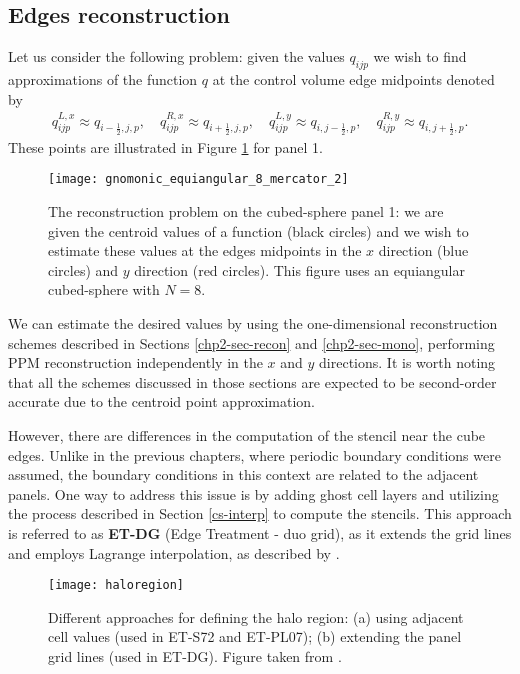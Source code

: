 \subsection{Edges reconstruction}
\label{cs-recon}
Let us consider the following problem: given the values $q_{ijp}$ we wish to find 
approximations of the function $q$ at the control volume edge midpoints denoted by
\begin{align*}
q^{L,x}_{ijp}  \approx q_{{i-\frac{1}{2}},j,p},\quad
q^{R,x}_{ijp}  \approx q_{{i+\frac{1}{2}},j,p},\quad
q^{L,y}_{ijp}  \approx q_{i,{j-\frac{1}{2}},p},\quad
q^{R,y}_{ijp}  \approx q_{i,{j+\frac{1}{2}},p}.
\end{align*}
These points are illustrated in Figure \ref{csgrid-rpoints} for panel 1.
\begin{figure}[!htb]
	\centering
	\texttt{[image: gnomonic\_equiangular\_8\_mercator\_2]}
	\caption{The reconstruction problem on the cubed-sphere panel 1: we are given the centroid values of a function (black circles)
		and we wish to estimate these values at the edges midpoints in the $x$ direction (blue circles) and $y$ direction (red circles).
		This figure uses an equiangular cubed-sphere with $N=8$.} \label{csgrid-rpoints}
\end{figure}

We can estimate the desired values by using the one-dimensional reconstruction schemes 
described in Sections \ref{chp2-sec-recon} and \ref{chp2-sec-mono}, 
performing PPM reconstruction independently in the $x$ and $y$ directions. 
It is worth noting that all the schemes discussed in those sections are 
expected to be second-order accurate due to the centroid point approximation.

However, there are differences in the computation of the stencil near the cube edges. 
Unlike in the previous chapters, where periodic boundary conditions were assumed, 
the boundary conditions in this context are related to the adjacent panels. 
One way to address this issue is by adding ghost cell layers and utilizing 
the process described in Section \ref{cs-interp} to compute the stencils. 
This approach is referred to as \textbf{ET-DG} (Edge Treatment - duo grid), 
as it extends the grid lines and employs Lagrange interpolation, 
as described by \citet{zerroukat:2022}.
\begin{figure}[!htb]
	\centering
	\texttt{[image: haloregion]}
	\caption{Different approaches for defining the halo region:
    (a) using adjacent cell values (used in ET-S72 and ET-PL07);
    (b) extending the panel grid lines (used in ET-DG). 
    Figure taken from \citet{ross:2006}.\label{chp4-haloregion}}
\end{figure}

